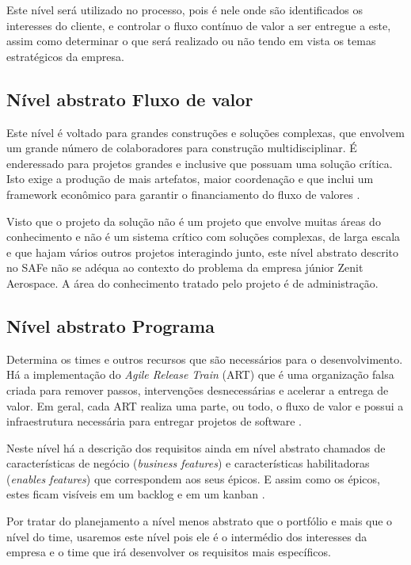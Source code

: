 Este nível será utilizado no processo, pois é nele onde são identificados os interesses do cliente, e controlar o fluxo contínuo de valor a ser entregue a este, assim como determinar o que será realizado ou não tendo em vista os temas estratégicos da empresa.

\subsection{Nível abstrato Fluxo de valor}

Este nível é voltado para grandes construções e soluções complexas, que envolvem um grande número de colaboradores para construção multidisciplinar. É enderessado para projetos grandes e inclusive que possuam uma solução crítica. Isto exige a produção de mais artefatos, maior coordenação e que inclui um framework econômico para garantir o financiamento do fluxo de valores \cite{safe}.

Visto que o projeto da solução não é um projeto que envolve muitas áreas do conhecimento e não é um sistema crítico com soluções complexas, de larga escala e que hajam vários outros projetos interagindo junto, este nível abstrato descrito no SAFe não se adéqua ao contexto do problema da empresa júnior Zenit Aerospace. A área do conhecimento tratado pelo projeto é de administração.

\subsection{Nível abstrato Programa}

Determina os times e outros recursos que são necessários para o desenvolvimento. Há a implementação do \textit{Agile Release Train} (ART) que é uma organização falsa criada para remover passos, intervenções desnecessárias e acelerar a entrega de valor. Em geral, cada ART realiza uma parte, ou todo, o fluxo de valor e possui a infraestrutura necessária para entregar projetos de software \cite{safe}.

Neste nível há a descrição dos requisitos ainda em nível abstrato chamados de características de negócio (\textit{business features}) e características habilitadoras (\textit{enables features}) que correspondem aos seus épicos. E assim como os épicos, estes ficam visíveis em um backlog e em um kanban \cite{safe}.

Por tratar do planejamento a nível menos abstrato que o portfólio e mais que o nível do time, usaremos este nível pois ele é o intermédio dos interesses da empresa e o time que irá desenvolver os requisitos mais específicos.

